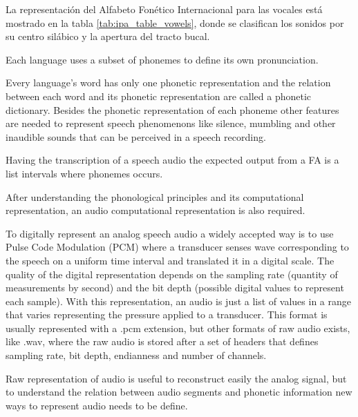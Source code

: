 La representación del Alfabeto Fonético Internacional para las vocales está mostrado en la tabla \ref{tab:ipa_table_vowels}, donde se clasifican los sonidos por su centro silábico y la apertura del tracto bucal.






Each language uses a subset of phonemes to define its own pronunciation.

Every language's word has only one phonetic representation and the relation between each word and its phonetic representation are called a phonetic dictionary. Besides the phonetic representation of each phoneme other features are needed to represent speech phenomenons like silence, mumbling and other inaudible sounds that can be perceived in a speech recording.

Having the transcription of a speech audio the expected output from a FA is a list intervals where phonemes occurs.

After understanding the phonological principles and its computational representation, an audio computational representation is also required.

To digitally represent an analog speech audio a widely accepted way is to use Pulse Code Modulation (PCM) where a transducer senses wave corresponding to the speech on a uniform time interval and translated it in a digital scale. The quality of the digital representation depends on the sampling rate (quantity of measurements by second) and the bit depth (possible digital values to represent each sample). With this representation, an audio is just a list of values in a range that varies representing the pressure applied to a transducer. This format is usually represented with a .pcm extension, but other formats of raw audio exists, like .wav, where the raw audio is stored after a set of headers that defines sampling rate, bit depth, endianness and number of channels.

Raw representation of audio is useful to reconstruct easily the analog signal, but to understand the relation between audio segments and phonetic information new ways to represent audio needs to be define.


